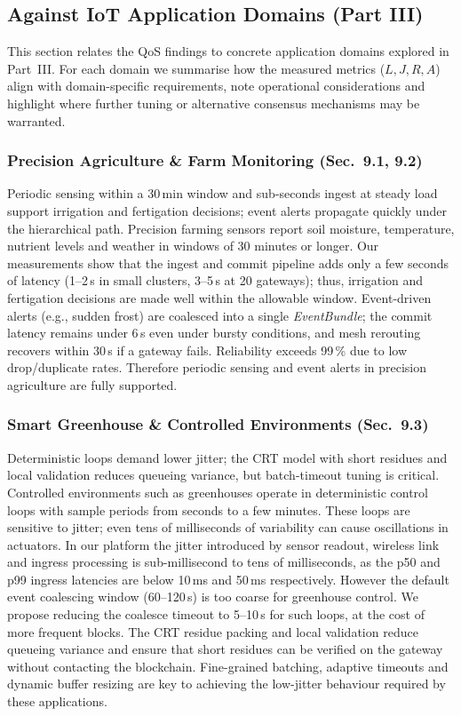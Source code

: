 \documentclass[12pt,onecolumn]{IEEEtran} %
\begin{document}
\subsection{Against IoT Application Domains (Part III)}
\label{subsec:domains}

This section relates the QoS findings to concrete application domains explored in Part~III. For each domain we summarise how the measured metrics ($L,J,R,A$) align with domain-specific requirements, note operational considerations and highlight where further tuning or alternative consensus mechanisms may be warranted.

\subsubsection{Precision Agriculture \& Farm Monitoring (Sec.~9.1, 9.2)}
Periodic sensing within a 30\,min window and sub-seconds ingest at steady load support irrigation and fertigation decisions; event alerts propagate quickly under the hierarchical path. Precision farming sensors report soil moisture, temperature, nutrient levels and weather in windows of 30 minutes or longer. Our measurements show that the ingest and commit pipeline adds only a few seconds of latency (1–2\,s in small clusters, 3–5\,s at 20 gateways); thus, irrigation and fertigation decisions are made well within the allowable window. Event-driven alerts (e.g., sudden frost) are coalesced into a single \emph{EventBundle}; the commit latency remains under 6\,s even under bursty conditions, and mesh rerouting recovers within 30\,s if a gateway fails. Reliability exceeds 99\,\% due to low drop/duplicate rates. Therefore periodic sensing and event alerts in precision agriculture are fully supported.

\subsubsection{Smart Greenhouse \& Controlled Environments (Sec.~9.3)}
Deterministic loops demand lower jitter; the CRT model with short residues and local validation reduces queueing variance, but batch-timeout tuning is critical. Controlled environments such as greenhouses operate in deterministic control loops with sample periods from seconds to a few minutes. These loops are sensitive to jitter; even tens of milliseconds of variability can cause oscillations in actuators. In our platform the jitter introduced by sensor readout, wireless link and ingress processing is sub-millisecond to tens of milliseconds, as the p50 and p99 ingress latencies are below 10\,ms and 50\,ms respectively. However the default event coalescing window (60–120\,s) is too coarse for greenhouse control. We propose reducing the coalesce timeout to 5–10\,s for such loops, at the cost of more frequent blocks. The CRT residue packing and local validation reduce queueing variance and ensure that short residues can be verified on the gateway without contacting the blockchain. Fine-grained batching, adaptive timeouts and dynamic buffer resizing are key to achieving the low-jitter behaviour required by these applications.
\end{document}
